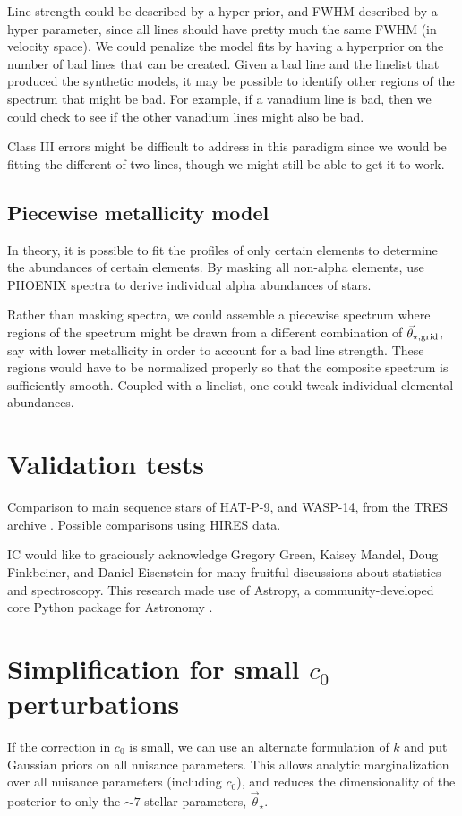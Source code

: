 \documentclass[preprint]{aastex} %
\newcommand{\vt}{\vec{\theta}}
\newcommand{\vg}{\vt_{\star, {\rm grid}}}
\newcommand{\vstar}{\vt_{\star}}
\begin{document}
Line strength could be described by a hyper prior, and FWHM described by a hyper parameter, since all lines should have pretty much the same FWHM (in velocity space). We could penalize the model fits by having a hyperprior on the number of bad lines that can be created. Given a bad line and the linelist that produced the synthetic models, it may be possible to identify other regions of the spectrum that might be bad. For example, if a vanadium line is bad, then we could check to see if the other vanadium lines might also be bad. 

Class III errors might be difficult to address in this paradigm since we would be fitting the different of two lines, though we might still be able to get it to work. 

\subsection{Piecewise metallicity model}
In theory, it is possible to fit the profiles of only certain elements to determine the abundances of certain elements. By masking all non-alpha elements, \citet{hus12} use PHOENIX spectra to derive individual alpha abundances of stars.

Rather than masking spectra, we could assemble a piecewise spectrum where regions of the spectrum might be drawn from a different combination of $\vg$, say with lower metallicity in order to account for a bad line strength. These regions would have to be normalized properly so that the composite spectrum is sufficiently smooth. Coupled with a linelist, one could tweak individual elemental abundances.

\section{Validation tests}
Comparison to main sequence stars of HAT-P-9, and WASP-14, from the TRES archive \citep{tfs+12}. Possible comparisons using HIRES data.


\acknowledgments
IC would like to graciously acknowledge Gregory Green, Kaisey Mandel, Doug Finkbeiner, and Daniel Eisenstein for many fruitful discussions about statistics and spectroscopy. This research made use of Astropy, a community-developed core Python package for Astronomy \citep{art+13}.

\appendix

\section{Simplification for small $c_0$ perturbations}
\label{sec:gaussian_simplification}
If the correction in $c_0$ is small, we can use an alternate formulation of $k$ and put Gaussian priors on all nuisance parameters. This allows analytic marginalization over all nuisance parameters (including $c_0$), and reduces the dimensionality of the posterior to only the $\sim 7$ stellar parameters, $\vstar$.
\end{document}
